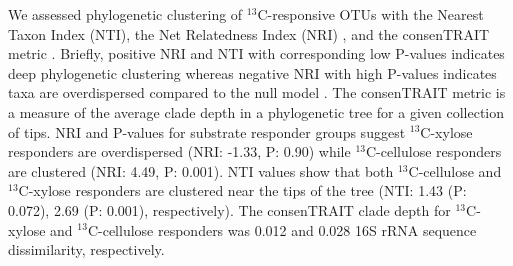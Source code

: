 We assessed phylogenetic clustering of $^{13}$C-responsive OTUs with the
Nearest Taxon Index (NTI), the Net Relatedness Index (NRI)
\citep{Webb2000}, and the consenTRAIT metric \citep{Martiny2013}.
Briefly, positive NRI and NTI with corresponding low P-values indicates
deep phylogenetic clustering whereas negative NRI with high P-values indicates
taxa are overdispersed compared to the null model \citep{Evans2014a}. The
consenTRAIT metric is a measure of the average clade depth in a phylogenetic
tree for a given collection of tips. NRI and P-values for substrate responder
groups suggest $^{13}$C-xylose responders are overdispersed (NRI: -1.33, P:
0.90) while $^{13}$C-cellulose responders are clustered (NRI: 4.49, P: 0.001).
NTI values show that both $^{13}$C-cellulose and $^{13}$C-xylose responders
are clustered near the tips of the tree (NTI: 1.43 (P: 0.072), 2.69 (P:
0.001), respectively). The consenTRAIT clade depth for $^{13}$C-xylose and
$^{13}$C-cellulose responders was 0.012 and 0.028 16S rRNA sequence
dissimilarity, respectively.





